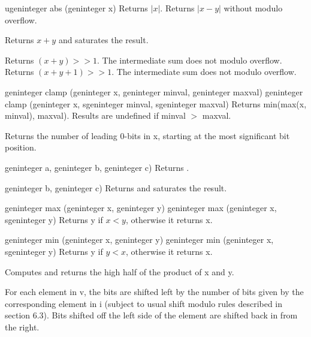 \addRow
{
ugeninteger abs (geninteger x)
}
{
Returns $| x |$.
}
{ Returns $| x - y |$  without modulo overflow.}

{ Returns $x + y$ and saturates the result.}

{
 Returns $(x + y) >> 1$. The intermediate sum does
not modulo overflow.
}
 {
 Returns $(x + y + 1) >> 1$. The intermediate sum
does not modulo overflow.
}

\addRowTwoL
{geninteger clamp (geninteger x, geninteger minval, geninteger maxval)}
{geninteger clamp (geninteger x, sgeninteger minval, sgeninteger maxval)}
{
 Returns min(max(x, minval), maxval).
 Results are undefined if minval $>$ maxval.
}

{
 Returns the number of leading 0-bits in x, starting
 at the most significant bit position.
}

{geninteger a, geninteger b, geninteger c)}
 {Returns . }

{geninteger b, geninteger c)}
{Returns  and saturates the result.}

\addRowTwoSL
{geninteger max (geninteger x, geninteger y)}
{geninteger max (geninteger x, sgeninteger y)}
{Returns y if $x < y$, otherwise it returns x.}


\addRowTwoSL
{geninteger min (geninteger x, geninteger y)}
{geninteger min (geninteger x, sgeninteger y)}
{Returns y if $y < x$, otherwise it returns x.}

{
Computes  and returns the high half of the
product of x and y.
}

{
For each element in v, the bits are shifted left by
the number of bits given by the corresponding
element in i (subject to usual shift modulo rules
described in section 6.3). Bits shifted off the left
side of the element are shifted back in from the
right.
}

